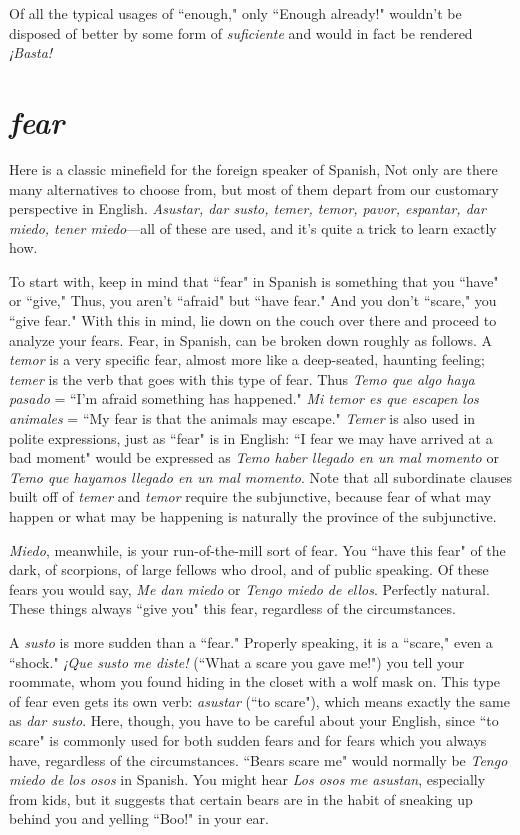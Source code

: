 Of all the typical usages of ``enough," only ``Enough already!"
wouldn't be disposed of better by some form of \emph{suficiente} and would in
fact be rendered \emph{¡Basta!}

\section{\emph{fear}}

Here is a classic minefield for the foreign speaker of Spanish,
Not only are there many alternatives to choose from, but most of them
depart from our customary perspective in English. \emph{Asustar, dar susto,
temer, temor, pavor, espantar, dar miedo, tener miedo}---all of these
are used, and it's quite a trick to learn exactly how.

To start with, keep in mind that ``fear" in Spanish is something that you ``have" or ``give," Thus, you aren't ``afraid" but ``have
fear." And you don't ``scare," you ``give fear." With this in mind, lie
down on the couch over there and proceed to analyze your fears. Fear,
in Spanish, can be broken down roughly as follows. A \emph{temor} is a very
specific fear, almost more like a deep-seated, haunting feeling; \emph{temer}
is the verb that goes with this type of fear. Thus \emph{Temo que algo haya
pasado} = ``I'm afraid something has happened." \emph{Mi temor es que escapen los animales} = ``My fear is that the animals may escape." \emph{Temer}
is also used in polite expressions, just as ``fear" is in English: ``I fear we
may have arrived at a bad moment" would be expressed as \emph{Temo haber
llegado en un mal momento} or \emph{Temo que hayamos llegado en un mal
momento}. Note that all subordinate clauses built off of \emph{temer} and \emph{temor} require the subjunctive, because fear of what may happen or what
may be happening is naturally the province of the subjunctive.

\emph{Miedo}, meanwhile, is your run-of-the-mill sort of fear. You
``have this fear" of the dark, of scorpions, of large fellows who drool,
and of public speaking. Of these fears you would say, \emph{Me dan miedo}
or \emph{Tengo miedo de ellos}. Perfectly natural. These things always ``give
you" this fear, regardless of the circumstances.

A \emph{susto} is more sudden than a ``fear." Properly speaking, it is a
``scare," even a ``shock." \emph{¡Que susto me diste!} (``What a scare you gave
me!") you tell your roommate, whom you found hiding in the closet
with a wolf mask on. This type of fear even gets its own verb: \emph{asustar}
(``to scare"), which means exactly the same as \emph{dar susto}. Here, though,
you have to be careful about your English, since ``to scare" is commonly used for both sudden fears and for fears which you always have,
regardless of the circumstances. ``Bears scare me" would normally
be \emph{Tengo miedo de los osos} in Spanish. You might hear \emph{Los osos me
asustan}, especially from kids, but it suggests that certain bears are in
the habit of sneaking up behind you and yelling ``Boo!" in your ear.

